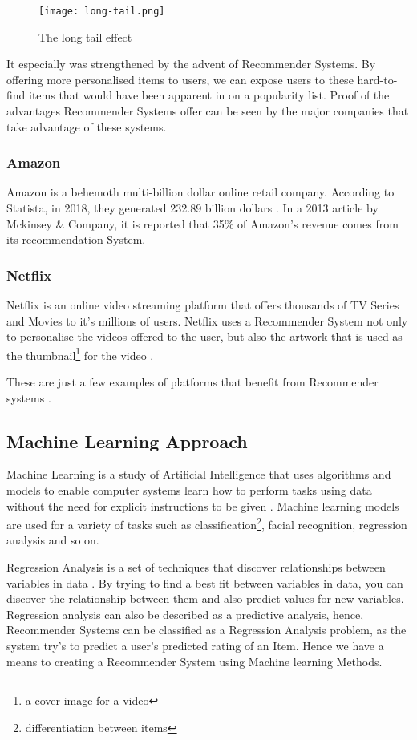\begin{figure}[htb!]
    \centering
    \texttt{[image: long-tail.png]}
    \caption{The long tail effect \cite{longtaileffect}}
    \label{fig:longtail}
\end{figure}

It especially was strengthened by the advent of Recommender Systems. By offering more personalised items to users, we can expose users to these hard-to-find items that would have been apparent in on a popularity list. Proof of the advantages Recommender Systems offer can be seen by the major companies that take advantage of these systems.


\subsubsection{Amazon} 
Amazon is a behemoth multi-billion dollar online retail company. According to Statista, in 2018, they generated 232.89 billion dollars \cite{statista}. In a 2013 article by Mckinsey \& Company, it is reported that 35\% of Amazon's revenue comes from its recommendation System. 

\subsubsection{Netflix}
Netflix is an online video streaming platform that offers thousands of TV Series and Movies to it's millions of users. Netflix uses a Recommender System not only to personalise the videos offered to the user, but also the artwork that is used as the thumbnail\footnote{a cover image for a video} for the video \cite{josefina2018netflix}.

These are just a few examples of platforms that benefit from Recommender systems \cite{polatidis2013recommender}.

\subsection{Machine Learning Approach} \label{subsec:mlApproach}
Machine Learning is a study of Artificial Intelligence that uses algorithms and models to enable computer systems learn how to perform tasks using data without the need for explicit instructions to be given \cite{michie1994machine}. Machine learning models are used for a variety of tasks such as classification\footnote{differentiation between items}, facial recognition, regression analysis and so on.

Regression Analysis is a set of techniques that discover relationships between variables in data \cite{chatterjee2015regression}. By trying to find a best fit between variables in data, you can discover the relationship between them and also predict values for new variables. Regression analysis can also be described as a predictive analysis, hence, Recommender Systems can be classified as a Regression Analysis problem, as the system try's to predict a user's predicted rating of an Item. Hence we have a means to creating a Recommender System using Machine learning Methods.

